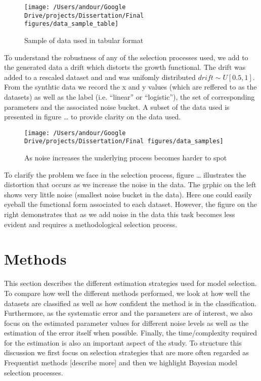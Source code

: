\documentclass[]{article}
\begin{document}
\begin{figure}

{\centering \texttt{[image: /Users/andour/Google Drive/projects/Dissertation/Final figures/data\_sample\_table]} 

}

\caption{Sample of data used in tabular format}\label{fig:unnamed-chunk-1}
\end{figure}

To understand the robustness of any of the selection processes used, we
add to the generated data a drift which distorts the growth functional.
The drift was added to a rescaled dataset and and was unifomly
distributed \(drift \sim U[0.5, 1]\). From the synthtic data we record
the x and y values (which are reffered to as the datasets) as well as
the label (i.e. ``linear'' or ``logistic''), the set of corresponding
parameters and the associated noise bucket. A subset of the data used is
presented in figure \ldots{} to provide clarity on the data used.

\begin{figure}

{\centering \texttt{[image: /Users/andour/Google Drive/projects/Dissertation/Final figures/data\_samples]} 

}

\caption{As noise increases the underlying process becomes harder to spot}\label{fig:unnamed-chunk-2}
\end{figure}

To clarify the problem we face in the selection process, figure \ldots{}
illustrates the distortion that occurs as we increase the noise in the
data. The grphic on the left shows very little noise (smallest noise
bucket in the data). Here one could easily eyeball the functional form
associated to each dataset. However, the figure on the right
demonstrates that as we add noise in the data this task becomes less
evident and requires a methodological selection process.

\hypertarget{methods}{%
\section{Methods}\label{methods}}

This section describes the different estimation strategies used for
model selection. To compare how well the different methods performed, we
look at how well the datasets are classified as well as how confident
the method is in the classification. Furthermore, as the systematic
error and the parameters are of interest, we also focus on the estimated
parameter values for different noise levels as well as the estimation of
the error itself when possible. Finally, the time/complexity required
for the estimation is also an important aspect of the study. To
structure this discussion we first focus on selection strategies that
are more often regarded as Frequentist methods {[}describe more{]} and
then we highlight Bayesian model selection processes.
\end{document}
